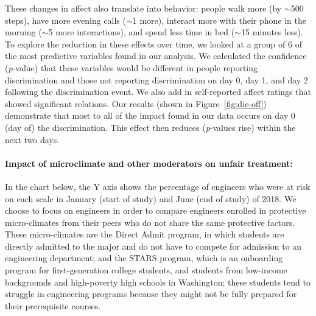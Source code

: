 These changes in affect also translate into behavior: people walk more (by $\sim$500 steps), have more evening calls ($\sim$1 more), interact more with their phone in the morning ($\sim$5 more interactions), and spend less time in bed ($\sim$15 minutes less).
To explore the reduction in these effects over time, we looked at a group of 6 of the most predictive variables found in our analysis. We calculated the confidence (\textit{p}-value) that these variables would be different in people reporting discrimination and those not reporting discrimination %
on day 0, day 1, and day 2 following the discrimination event. We also add in self-reported affect ratings that showed significant relations. Our results (shown in Figure~\ref{fig:die-off}) demonstrate that most to all of the impact found in our data occurs on  day 0 (day of)  the discrimination. This effect then reduces (\textit{p}-values rise) within the next two days. 

\paragraph{Impact of microclimate and other moderators on unfair treatment:} 
In the chart below, the Y axis shows the percentage of engineers who were at risk on each scale in January (start of study) and June (end of study) of 2018. We choose to focus on engineers in order to compare engineers enrolled in protective micro-climates from their peers who do not share the same protective factors. These micro-climates are the Direct Admit program, in which students are directly admitted to the major and do not have to compete for admission to an engineering department; and the STARS program, which is an onboarding program for first-generation college students, and students from low-income backgrounds and high-poverty high schools in Washington; these students tend to struggle in engineering programs because they  might not be fully prepared for their prerequisite  courses. 
